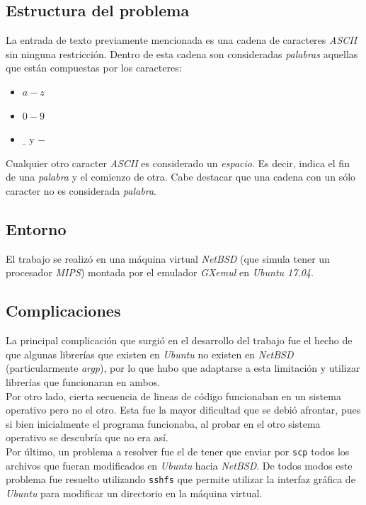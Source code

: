 \documentclass[a4paper, 10pt]{article}
\def\code#1{\texttt{#1}}
\newcommand\tab[1][0.5cm]{\hspace*{#1}}
\begin{document}
		\subsection{Estructura del problema}
			La entrada de texto previamente mencionada es una cadena de caracteres \emph{ASCII}
			sin ninguna restricción. Dentro de esta cadena son consideradas \emph{palabras} aquellas
			que están compuestas por los caracteres:
			\begin{itemize}
				\item $a-z$
				\item $0-9$
				\item $\_$ y $-$
			\end{itemize}
			\tab Cualquier otro caracter \emph{ASCII} es considerado un \emph{espacio}. Es decir,
			indica el fin de una \emph{palabra} y el comienzo de otra. Cabe destacar que una cadena
			con un sólo caracter no es considerada \emph{palabra}.
		\subsection{Entorno}
			El trabajo se realizó en una máquina virtual \emph{NetBSD} (que simula tener un procesador
			\emph{MIPS}) montada por el emulador \emph{GXemul} en \emph{Ubuntu 17.04}.
		\subsection{Complicaciones}
			La principal complicación que surgió en el desarrollo del trabajo fue el hecho de que algunas
			librerías que existen en \emph{Ubuntu} no existen en \emph{NetBSD} (particularmente \emph{argp}),
			por lo que hubo que adaptarse a esta limitación y utilizar librerías que funcionaran en ambos. \\
			\tab Por otro lado, cierta secuencia de lineas de código funcionaban en un sistema operativo pero
			no el otro. Esta fue la mayor dificultad que se debió afrontar, pues si bien inicialmente el programa
			funcionaba, al probar en el otro sistema operativo se descubría que no era así. \\
			\tab Por último, un problema a resolver fue el de tener que enviar por \code{scp} todos los archivos
			que fueran modificados en \emph{Ubuntu} hacia \emph{NetBSD}. De todos modos este problema fue
			resuelto utilizando \code{sshfs} que permite utilizar la interfaz gráfica de \emph{Ubuntu} para
			modificar un directorio en la máquina virtual.
\end{document}

